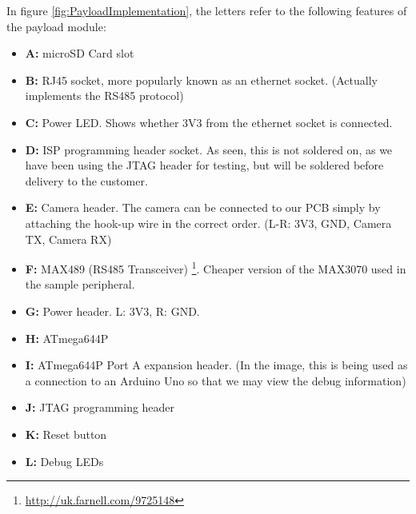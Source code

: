 In figure \ref{fig:PayloadImplementation}, the letters refer to the following 
features of the payload module:

\begin{itemize}
\item \textbf{A:} microSD Card slot
\item \textbf{B:} RJ45 socket, more popularly known as an ethernet socket. 
(Actually implements the RS485 protocol)
\item \textbf{C:} Power LED. Shows whether 3V3 from the ethernet socket is connected.
\item \textbf{D:} ISP programming header socket. As seen, this is not 
soldered on, as we have been using the JTAG header for testing, but will be soldered 
before delivery to the customer.
\item \textbf{E:} Camera header. The camera can be connected to our PCB 
simply by attaching the hook-up wire in the correct order. (L-R: 3V3, GND, 
Camera TX, Camera RX)
\item \textbf{F:} MAX489 (RS485 Transceiver) \footnote{\url{http://uk.farnell.com/9725148}}. 
Cheaper version of the MAX3070 used in the sample peripheral.
\item \textbf{G:} Power header. L: 3V3, R: GND.
\item \textbf{H:} ATmega644P \cite{atmega644p}
\item \textbf{I:} ATmega644P Port A expansion header. (In the image, this is 
being used as a connection to an Arduino Uno so that we may view the debug 
information)
\item \textbf{J:} JTAG programming header
\item \textbf{K:} Reset button
\item \textbf{L:} Debug LEDs
\end{itemize}
